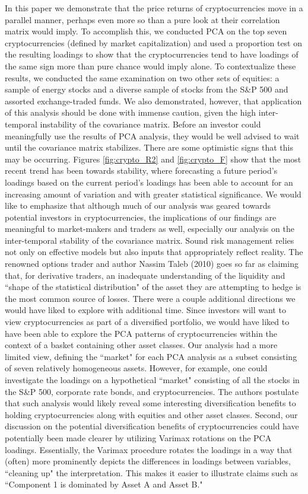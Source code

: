 \documentclass[12pt,twoside]{article}
\begin{document}
In this paper we demonstrate that the price returns of cryptocurrencies move in a parallel manner, perhaps even more so than a pure look at their correlation matrix would imply. To accomplish this, we conducted PCA on the top seven cryptocurrencies (defined by market capitalization) and used a proportion test on the resulting loadings to show that the cryptocurrencies tend to have loadings of the same sign more than pure chance would imply alone. To contextualize these results, we conducted the same examination on two other sets of equities: a sample of energy stocks and a diverse sample of stocks from the S\&P 500 and assorted exchange-traded funds.
\bigbreak
We also demonstrated, however, that application of this analysis should be done with immense caution, given the high inter-temporal instability of the covariance matrix. Before an investor could meaningfully use the results of PCA analysis, they would be well advised to wait until the covariance matrix stabilizes. There are some optimistic signs that this may be occurring. Figures \ref{fig:crypto_R2} and \ref{fig:crypto_F} show that the most recent trend has been towards stability, where forecasting a future period's loadings based on the current period's loadings has been able to account for an increasing amount of variation and with greater statistical significance.
\bigbreak
We would like to emphasize that although much of our analysis was geared towards potential investors in cryptocurrencies, the implications of our findings are meaningful to market-makers and traders as well, especially our analysis on the inter-temporal stability of the covariance matrix. Sound risk management relies not only on effective models but also inputs that appropriately reflect reality. The renowned options trader and author Nassim Taleb (2010) goes so far as claiming that, for derivative traders, an inadequate understanding of the liquidity and ``shape of the statistical distribution" of the asset they are attempting to hedge is the most common source of losses. 
\bigbreak
There were a couple additional directions we would have liked to explore with additional time. Since investors will want to view cryptocurrencies as part of a diversified portfolio, we would have liked to have been able to explore the PCA patterns of cryptocurrencies within the context of a basket containing other asset classes. Our analysis had a more limited view, defining the ``market" for each PCA analysis as a subset consisting of seven relatively homogeneous assets. However, for example, one could investigate the loadings on a hypothetical ``market" consisting of all the stocks in the S\&P 500, corporate rate bonds, and cryptocurrencies. The authors postulate that such analysis would likely reveal some interesting diversification benefits to holding cryptocurrencies along with equities and other asset classes. Second, our discussion on the potential diversification benefits of cryptocurrencies could have potentially been made clearer by utilizing Varimax rotations on the PCA loadings. Essentially, the Varimax procedure rotates the loadings in a way that (often) more prominently depicts the differences in loadings between variables, ``cleaning up" the interpretation. This makes it easier to illustrate claims such as ``Component 1 is dominated by Asset A and Asset B."
\end{document}
